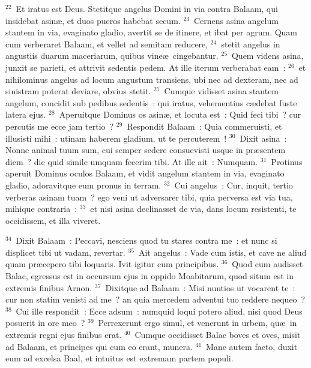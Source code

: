 ${}^{22}$~Et iratus est Deus. Stetitque angelus Domini in via contra Balaam, qui insidebat asin\ae , et duos pueros habebat secum.
${}^{23}$~Cernens asina angelum stantem in via, evaginato gladio, avertit se de itinere, et ibat per agrum. Quam cum verberaret Balaam, et vellet ad semitam reducere,
${}^{24}$~stetit angelus in angustiis duarum maceriarum, quibus vine\ae\ cingebantur.
${}^{25}$~Quem videns asina, junxit se parieti, et attrivit sedentis pedem. At ille iterum verberabat eam~:
${}^{26}$~et nihilominus angelus ad locum angustum transiens, ubi nec ad dexteram, nec ad sinistram poterat deviare, obvius stetit.
${}^{27}$~Cumque vidisset asina stantem angelum, concidit sub pedibus sedentis~: qui iratus, vehementius c\ae debat fuste latera ejus.
${}^{28}$~Aperuitque Dominus os asin\ae , et locuta est~: Quid feci tibi~? cur percutis me ecce jam tertio~?
${}^{29}$~Respondit Balaam~: Quia commeruisti, et illusisti mihi~: utinam haberem gladium, ut te percuterem~!
${}^{30}$~Dixit asina~: Nonne animal tuum sum, cui semper sedere consuevisti usque in pr\ae sentem diem~? dic quid simile umquam fecerim tibi. At ille ait~: Numquam.
${}^{31}$~Protinus aperuit Dominus oculos Balaam, et vidit angelum stantem in via, evaginato gladio, adoravitque eum pronus in terram.
${}^{32}$~Cui angelus~: Cur, inquit, tertio verberas asinam tuam~? ego veni ut adversarer tibi, quia perversa est via tua, mihique contraria~:
${}^{33}$~et nisi asina declinasset de via, dans locum resistenti, te occidissem, et illa viveret.


${}^{34}$~Dixit Balaam~: Peccavi, nesciens quod tu stares contra me~: et nunc si displicet tibi ut vadam, revertar.
${}^{35}$~Ait angelus~: Vade cum istis, et cave ne aliud quam pr\ae cepero tibi loquaris. Ivit igitur cum principibus.
${}^{36}$~Quod cum audisset Balac, egressus est in occursum ejus in oppido Moabitarum, quod situm est in extremis finibus Arnon.
${}^{37}$~Dixitque ad Balaam~: Misi nuntios ut vocarent te~: cur non statim venisti ad me~? an quia mercedem adventui tuo reddere nequeo~?
${}^{38}$~Cui ille respondit~: Ecce adsum~: numquid loqui potero aliud, nisi quod Deus posuerit in ore meo~?
${}^{39}$~Perrexerunt ergo simul, et venerunt in urbem, qu\ae\ in extremis regni ejus finibus erat.
${}^{40}$~Cumque occidisset Balac boves et oves, misit ad Balaam, et principes qui cum eo erant, munera.
${}^{41}$~Mane autem facto, duxit eum ad excelsa Baal, et intuitus est extremam partem populi.

